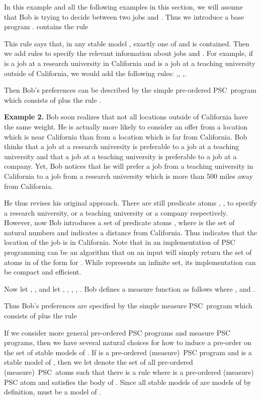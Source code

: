 \documentclass[letterpaper]{article}\usepackage{aaai}
\begin{document}
In this example and all the following examples in this section, we will assume
that Bob is trying to decide between two jobs  and . Thus we
introduce a base program .  contains the rule

This rule says that, in any stable model , exactly one of  and
 is contained. Then we add rules to specify the relevant information
about jobs  and . For example, if  is a job at a research
university in California and  is a job at a teaching university outside
of California, we would add the following rules: ,, ,.

Then Bob's preferences can be described by the simple pre-ordered PSC\ program
 which consists of  plus the rule . \ \ 

\textbf{Example 2.}\label{Ex2} Bob soon realizes that not all locations
outside of California have the same weight. He is actually more likely to
consider an offer from a location which is near California than from a
location which is far from California. Bob thinks that a job at a research
university is preferable to a job at a teaching university and that a job at a
teaching university is preferable to a job at a company. Yet, Bob notices that
he will prefer a job from a teaching university in California to a job from a
research university which is more than 500 miles away from California.

He thus revises his original approach. There are still predicate atoms ,
,  to specify a research university, or a teaching university or a
company respectively. However, now Bob introduces a set of predicate atoms
, where  is
the set of natural numbers and  indicates a distance 
from California. Thus  indicates that the location of the
job is in California. Note that in an implementation of PSC programming
 can be an algorithm that on an input  will simply return the
set of atoms in  of the form  for . While
 represents an infinite set, its implementation can be compact
and efficient.

Now let , ,  and let ,  , , , . Bob defines a measure function as
follows  where ,  and .

Thus Bob's preferences are specified by the simple measure PSC\ program which
consists of  plus the rule  \ 

If we consider more general pre-ordered PSC programs  and measure PSC
programs, then we have several natural choices for how to induce a pre-order
on the set of stable models of . If  is a pre-ordered (measure)\ PSC
program and  is a stable model of , then we let  denote the set of all pre-ordered (measure)\ PSC\ atoms  such that there
is a rule  where  is a pre-ordered
(measure) PSC atom and  satisfies the body of . Since all stable models
of  are models of  by definition,  must be a model of .
\end{document}
